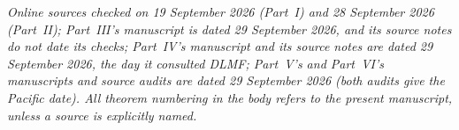 \documentclass[11pt,a4paper]{article}
\numberwithin{equation}{section}
\theoremstyle{definition}
\theoremstyle{remark}
\begin{document}
\noindent\small\textit{Online sources checked on 19 September 2026
(Part~I) and 28 September 2026 (Part~II); Part~III's manuscript is dated
29 September 2026, and its source notes do not date its checks; Part~IV's
manuscript and its source notes are dated 29 September 2026, the day it
consulted DLMF; Part~V's and Part~VI's manuscripts and source audits are
dated 29 September 2026 (both audits give the Pacific date).
All theorem numbering in the body refers to the present manuscript,
unless a source is explicitly named.}
\end{document}
